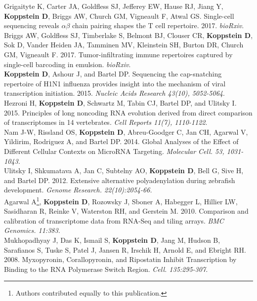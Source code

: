\documentclass[10pt,a4paper]{article}
\begin{document}
{{{{{{\noindent Grigaityte K, Carter JA, Goldfless SJ, Jefferey EW, Hause RJ, Jiang Y, \textbf{Koppstein D}, Briggs AW, Church GM, Vigneault F, Atwal GS. Single-cell sequencing reveals $\alpha \beta$ chain pairing shapes the T cell repertoire. 2017. \textit{bioRxiv}.} \vspace{-0.8em} \\
{\noindent Briggs AW, Goldfless SJ, Timberlake S, Belmont BJ, Clouser CR, \textbf{Koppstein D}, Sok D, Vander Heiden JA, Tamminen MV, Kleinstein SH, Burton DR, Church GM, Vigneault F. 2017. Tumor-infiltrating immune repertoires captured by single-cell barcoding in emulsion. \textit{bioRxiv}. \vspace{0.5em} \\
{\noindent \textbf{Koppstein D}, Ashour J, and Bartel DP. Sequencing the cap-snatching repertoire of H1N1
influenza provides insight into the mechanism of viral transcription initiation. 2015. \textit{Nucleic Acids Research 43(10), 5052-5064}.} \vspace{0.5em} \\
{\noindent Hezroni H, \textbf{Koppstein D}, Schwartz M, Tabin CJ, Bartel DP, and Ulitsky I. 2015. Principles of long noncoding
RNA evolution derived from direct comparison of transcriptomes in 14 vertebrates. \textit{Cell Reports 11(7), 1110-1122}}. \vspace{0.5em} \\
{\noindent Nam J-W, Rissland OS, \textbf{Koppstein D}, Abreu-Goodger C, Jan CH, Agarwal V, Yildirim, Rodriguez A, and Bartel DP. 2014. Global Analyses of the Effect of Different Cellular Contexts on MicroRNA Targeting. \textit{Molecular Cell. 53, 1031-1043.}} \vspace{0.5em} \\
{\noindent Ulitsky I, Shkumatava A, Jan C, Subtelny AO, \textbf{Koppstein D}, Bell G, Sive H, and Bartel DP. 2012. Extensive alternative polyadenylation during zebrafish development. \textit{Genome Research. 22(10):2054-66.}} \vspace{0.5em} \\
{\noindent Agarwal A\footnote[1]{Authors contributed equally to this publication.}, \textbf{Koppstein D}\footnotemark[1], Rozowsky J, Sboner A, Habegger L, Hillier LW, Sasidharan R, Reinke V, Waterston RH, and Gerstein M. 2010. Comparison and calibration of transcriptome data from RNA-Seq and tiling arrays. \textit{BMC Genomics. 11:383.}} \vspace{0.3em} \\
{\noindent Mukhopadhyay J, Das K, Ismail S, \textbf{Koppstein D}, Jang M, Hudson B, Sarafianos S, Tuske S, Patel J, Jansen R, Irschik H, Arnold E, and Ebright RH. 2008. Myxopyronin, Corallopyronin, and Ripostatin Inhibit Transcription by Binding to the RNA Polymerase Switch Region. \textit{Cell. 135:295-307.}} \vspace{0.3em} \\

}}}}}}
\end{document}
